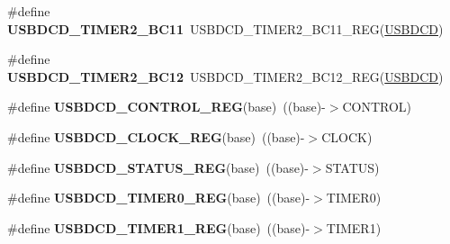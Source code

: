 \begin{DoxyCompactItemize}
\item 
\#define {\bfseries U\+S\+B\+D\+C\+D\+\_\+\+T\+I\+M\+E\+R2\+\_\+\+B\+C11}~U\+S\+B\+D\+C\+D\+\_\+\+T\+I\+M\+E\+R2\+\_\+\+B\+C11\+\_\+\+R\+EG(\hyperlink{group__USBDCD__Peripheral__Access__Layer_gacd05c07582eca3f464f8c7436ed56ec1}{U\+S\+B\+D\+CD})\hypertarget{group__USBDCD__Register__Accessor__Macros_gab5f6e255be874b10b2b5026f3b9f9e03}{}\label{group__USBDCD__Register__Accessor__Macros_gab5f6e255be874b10b2b5026f3b9f9e03}

\item 
\#define {\bfseries U\+S\+B\+D\+C\+D\+\_\+\+T\+I\+M\+E\+R2\+\_\+\+B\+C12}~U\+S\+B\+D\+C\+D\+\_\+\+T\+I\+M\+E\+R2\+\_\+\+B\+C12\+\_\+\+R\+EG(\hyperlink{group__USBDCD__Peripheral__Access__Layer_gacd05c07582eca3f464f8c7436ed56ec1}{U\+S\+B\+D\+CD})\hypertarget{group__USBDCD__Register__Accessor__Macros_ga18aadd71a85c0649a689a33c8ddd16f6}{}\label{group__USBDCD__Register__Accessor__Macros_ga18aadd71a85c0649a689a33c8ddd16f6}

\item 
\#define {\bfseries U\+S\+B\+D\+C\+D\+\_\+\+C\+O\+N\+T\+R\+O\+L\+\_\+\+R\+EG}(base)~((base)-\/$>$C\+O\+N\+T\+R\+OL)\hypertarget{group__USBDCD__Register__Accessor__Macros_gaf1ee3cf2e633cf144d3031b73dc86777}{}\label{group__USBDCD__Register__Accessor__Macros_gaf1ee3cf2e633cf144d3031b73dc86777}

\item 
\#define {\bfseries U\+S\+B\+D\+C\+D\+\_\+\+C\+L\+O\+C\+K\+\_\+\+R\+EG}(base)~((base)-\/$>$C\+L\+O\+CK)\hypertarget{group__USBDCD__Register__Accessor__Macros_ga4472319b2e3fbc759dcbbdd1d59eb774}{}\label{group__USBDCD__Register__Accessor__Macros_ga4472319b2e3fbc759dcbbdd1d59eb774}

\item 
\#define {\bfseries U\+S\+B\+D\+C\+D\+\_\+\+S\+T\+A\+T\+U\+S\+\_\+\+R\+EG}(base)~((base)-\/$>$S\+T\+A\+T\+US)\hypertarget{group__USBDCD__Register__Accessor__Macros_gad3a65d4e3ab4e0956460892d8c7b5fe9}{}\label{group__USBDCD__Register__Accessor__Macros_gad3a65d4e3ab4e0956460892d8c7b5fe9}

\item 
\#define {\bfseries U\+S\+B\+D\+C\+D\+\_\+\+T\+I\+M\+E\+R0\+\_\+\+R\+EG}(base)~((base)-\/$>$T\+I\+M\+E\+R0)\hypertarget{group__USBDCD__Register__Accessor__Macros_gae3497bee34a13efbb8f41a7ab49af474}{}\label{group__USBDCD__Register__Accessor__Macros_gae3497bee34a13efbb8f41a7ab49af474}

\item 
\#define {\bfseries U\+S\+B\+D\+C\+D\+\_\+\+T\+I\+M\+E\+R1\+\_\+\+R\+EG}(base)~((base)-\/$>$T\+I\+M\+E\+R1)\hypertarget{group__USBDCD__Register__Accessor__Macros_ga5bfe8c0ea39fd49431de364a87fb4638}{}\label{group__USBDCD__Register__Accessor__Macros_ga5bfe8c0ea39fd49431de364a87fb4638}


\end{DoxyCompactItemize}
